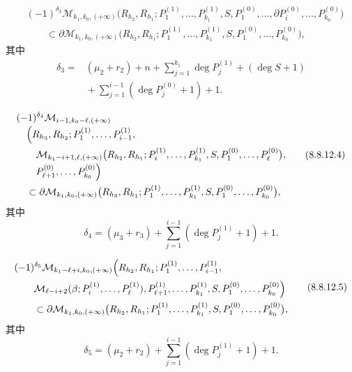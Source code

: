 \begin{equation}
\begin{aligned}
 &(-1)^{\delta_3}
 \mathcal M_{k_1,k_0,(+\infty)}
 \bigl(
 R_{h_2},R_{h_1};
 P_1^{(1)},\ldots,P_{k_1}^{(1)},
 S,P_1^{(0)},\ldots,\partial P_i^{(0)},\ldots,P_{k_0}^{(0)}
 \bigr)\\
 &\qquad\subset
 \partial\mathcal M_{k_1,k_0,(+\infty)}
 \bigl(
 R_{h_2},R_{h_1};
 P_1^{(1)},\ldots,P_{k_1}^{(1)},
 S,P_1^{(0)},\ldots,P_{k_0}^{(0)}
 \bigr),
\end{aligned}
\tag{8.8.12.3}\label{eq:8-8-12-3}
\end{equation}
其中
\[
\begin{aligned}
 \delta_3={}&
 (\mu_2+r_2)+n
 +\sum_{j=1}^{k_1}\deg P_j^{(1)}
 +(\deg S+1)\\
 &{}+\sum_{j=1}^{i-1}(\deg P_j^{(0)}+1)+1.
\end{aligned}
\]

\begin{equation}
\begin{aligned}
 &(-1)^{\delta_4}
 \mathcal M_{i-1,k_0-\ell,(+\infty)}\\[-2pt]
 &\quad
 \Bigl(
 R_{h_3},R_{h_2};
 P_1^{(1)},\ldots,P_{i-1}^{(1)},\\
 &\qquad
 \mathcal M_{k_1-i+1,\ell,(+\infty)}
 \bigl(
 R_{h_2},R_{h_1};
 P_i^{(1)},\ldots,P_{k_1}^{(1)},
 S,P_1^{(0)},\ldots,P_\ell^{(0)}
 \bigr),
 \\[-2pt]
 &\qquad
 P_{\ell+1}^{(0)},\ldots,P_{k_0}^{(0)}
 \Bigr)\\
 &\quad\subset
 \partial\mathcal M_{k_1,k_0,(+\infty)}
 \bigl(
 R_{h_3},R_{h_1};
 P_1^{(1)},\ldots,P_{k_1}^{(1)},
 S,P_1^{(0)},\ldots,P_{k_0}^{(0)}
 \bigr),
\end{aligned}
\tag{8.8.12.4}\label{eq:8-8-12-4}
\end{equation}
其中
\[
 \delta_4=(\mu_3+r_3)
 +\sum_{j=1}^{i-1}(\deg P_j^{(1)}+1)+1.
\]

\begin{equation}
\begin{aligned}
 &(-1)^{\delta_5}
 \mathcal M_{k_1-\ell+i,k_0,(+\infty)}
 \Bigl(
 R_{h_2},R_{h_1};
 P_1^{(1)},\ldots,P_{i-1}^{(1)},\\
 &\qquad
 \mathcal M_{\ell-i+2}
 (\beta;P_i^{(1)},\ldots,P_\ell^{(1)}),
 P_{\ell+1}^{(1)},\ldots,P_{k_1}^{(1)},
 S,P_1^{(0)},\ldots,P_{k_0}^{(0)}
 \Bigr)\\
 &\qquad\subset
 \partial\mathcal M_{k_1,k_0,(+\infty)}
 \bigl(
 R_{h_2},R_{h_1};
 P_1^{(1)},\ldots,P_{k_1}^{(1)},
 S,P_1^{(0)},\ldots,P_{k_0}^{(0)}
 \bigr),
\end{aligned}
\tag{8.8.12.5}\label{eq:8-8-12-5}
\end{equation}
其中
\[
 \delta_5=(\mu_2+r_2)
 +\sum_{j=1}^{i-1}(\deg P_j^{(1)}+1)+1.
\]

